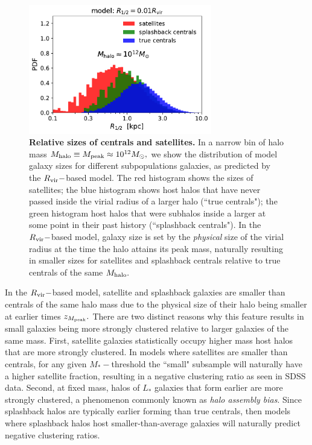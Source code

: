 \documentclass[usenatbib,usegraphicx,letterpaper]{mn2e}
\newcommand{\mstar}{M_{\ast}}
\newcommand{\mpeak}{M_{\rm peak}}
\newcommand{\zpeak}{z_{M_{\rm peak}}}
\newcommand{\mhalo}{M_{\rm halo}}
\newcommand{\rvir}{R_{\rm vir}}
\newcommand{\msun}{M_\odot}
\begin{document}
\begin{figure}
\centering
\includegraphics[width=8cm]{FIGS/rvir_only_cen_sat_sizes.pdf}
\caption{
{\bf Relative sizes of centrals and satellites.}
In a narrow bin of halo mass $\mhalo\equiv\mpeak\approx10^{12}\msun,$ we show the distribution of model galaxy sizes for different subpopulations galaxies, as predicted by the $\rvir-$based model. The red histogram shows the sizes of satellites; the blue histogram shows host halos that have never passed inside the virial radius of a larger halo (``true centrals"); the green histogram host halos that were subhalos inside a larger at some point in their past history (``splashback centrals"). In the $\rvir-$based model, galaxy size is set by the {\em physical} size of the virial radius at the time the halo attains its peak mass, naturally resulting in smaller sizes for satellites and splashback centrals relative to true centrals of the same $\mhalo.$
}
\label{fig:censatsizehist}
\end{figure}

In the $\rvir-$based model, satellite and splashback galaxies are smaller than centrals of the same halo mass due to the physical size of their halo being smaller at earlier times $\zpeak.$ There are two distinct reasons why this feature results in small galaxies being more strongly clustered relative to larger galaxies of the same mass. First, satellite galaxies statistically occupy higher mass host halos that are more strongly clustered. In models where satellites are smaller than centrals, for any given $\mstar-$threshold the ``small" subsample will naturally have a higher satellite fraction, resulting in a negative clustering ratio as seen in SDSS data. Second, at fixed mass, halos of $L_\ast$ galaxies that form earlier are more strongly clustered, a phenomenon commonly known as {\em halo assembly bias}. Since splashback halos are typically earlier forming than true centrals, then models where splashback halos host smaller-than-average galaxies will naturally predict negative clustering ratios.
\end{document}
